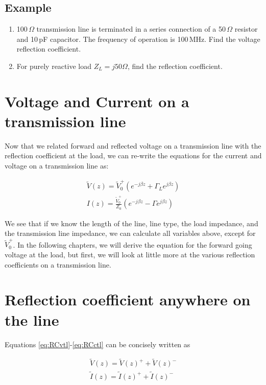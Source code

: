 \documentclass{ximera}
\begin{document}
\subsection{Example}


 \begin{enumerate}
\item 100\,$\Omega$ transmission line is terminated in a series
connection of a 50\,$\Omega$ resistor and 10\,pF capacitor. The frequency
of operation is 100\,MHz. Find the voltage reflection coefficient.
\item For purely reactive load $Z_L=j 50 \Omega$, find the reflection
coefficient.
\end{enumerate}

\section{Voltage and Current on a transmission line}

Now that we related forward and reflected voltage on a transmission line with the reflection coefficient at the load, we can re-write the equations for the current and voltage on a transmission line as:

\begin{eqnarray}
\tilde{V}(z)= \tilde{V}_0^+ (e^{-j \beta z} + \Gamma_L  e^{j \beta z }  ) \label{eq:vtlfin} \\
I(z)=   \frac{\tilde{V}_0^+}{Z_0}  (e^{-j \beta z} - \Gamma  e^{j \beta z}  ) \label{eq:itlfin}
\end{eqnarray}

We see that if we know the length of the line, line type, the load impedance, and the transmission line impedance, we can calculate all variables above, except for  $\tilde{V}_0^+ $. In the following chapters, we will derive the equation for the forward going voltage at the load, but first, we will look at little more at the various reflection coefficients on a transmission line. 

\section{Reflection coefficient anywhere on the line}

Equations \ref{eq:RCvtl}-\ref{eq:RCctl}  can be concisely written as 

\begin{eqnarray}
\tilde{V}(z) =\tilde{V}(z)^+ + \tilde{V}(z)^- \\
\tilde{I}(z) =\tilde{I}(z)^+ + \tilde{I}(z)^- 
\end{eqnarray}
\end{document}
